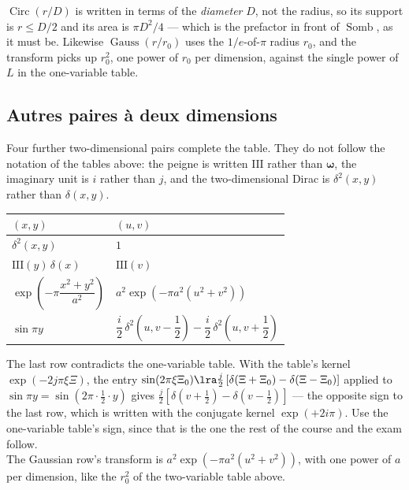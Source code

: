\begin{remark}
  $\operatorname{Circ}(r/D)$ is written in terms of the \emph{diameter} $D$, not
  the radius, so its support is $r\le D/2$ and its area is $\pi D^2/4$ --- which
  is the prefactor in front of $\operatorname{Somb}$, as it must be. Likewise
  $\operatorname{Gauss}(r/r_0)$ uses the $1/e$-of-$\pi$ radius $r_0$, and the
  transform picks up $r_0^2$, one power of $r_0$ per dimension, against the
  single power of $L$ in the one-variable table.
\end{remark}

\subsection{Autres paires à deux dimensions}

Four further two-dimensional pairs complete the table. They do not follow the
notation of the tables above: the peigne is written $\mathrm{III}$ rather than
$\boldsymbol{\omega}$, the imaginary unit is $i$ rather than $j$, and the
two-dimensional Dirac is $\delta^2(x,y)$ rather than $\delta(x,y)$.

\begin{table}[h!]
  \centering
  \begin{tabularx}{\textwidth}{>{\centering\arraybackslash}X >{\centering\arraybackslash}X}
    \toprule
    $(x,y)$ & $(u,v)$ \\
    \midrule
    $\delta^2(x,y)$ & $1$ \\[6pt]
    $\mathrm{III}(y)\,\delta(x)$ & $\mathrm{III}(v)$ \\[6pt]
    $\exp\!\left(-\pi\dfrac{x^2+y^2}{a^2}\right)$ & $a^2\exp\!\left(-\pi a^2(u^2+v^2)\right)$ \\[12pt]
    $\sin \pi y$
    & $\dfrac{i}{2}\,\delta^2\!\left(u,v-\dfrac{1}{2}\right)
      -\dfrac{i}{2}\,\delta^2\!\left(u,v+\dfrac{1}{2}\right)$ \\
    \bottomrule
  \end{tabularx}
\end{table}

\begin{remark}
  The last row contradicts the one-variable table. With the table's kernel
  $\exp(-2j\pi\xi\Xi)$, the entry $\sin(2\pi\xi\Xi_0)\lra
  \frac{j}{2}\left[\delta(\Xi+\Xi_0)-\delta(\Xi-\Xi_0)\right]$ applied to
  $\sin\pi y=\sin(2\pi\cdot\tfrac12\cdot y)$ gives
  $\frac{j}{2}\left[\delta(v+\tfrac12)-\delta(v-\tfrac12)\right]$ --- the
  opposite sign to the last row, which is written with the conjugate kernel
  $\exp(+2i\pi)$. Use the one-variable table's sign, since that is the one the
  rest of the course and the exam follow.\\

  The Gaussian row's transform is $a^2\exp(-\pi a^2(u^2+v^2))$, with one power
  of $a$ per dimension, like the $r_0^2$ of the two-variable table above.
\end{remark}

